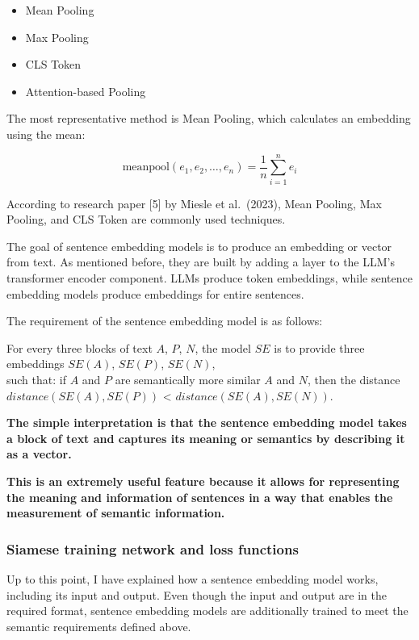 \documentclass[11pt]{wseas}
\begin{document}
\begin{itemize}
\tightlist
\item
  Mean Pooling
\item
  Max Pooling
\item
  CLS Token
\item
  Attention-based Pooling
\end{itemize}

The most representative method is Mean Pooling, which calculates an
embedding using the mean:

\[
\text{meanpool}(e_1, e_2, \ldots, e_n) = \frac{1}{n} \sum_{i=1}^{n} e_i
\]

According to research paper {[}5{]} by Miesle et al.~(2023), Mean
Pooling, Max Pooling, and CLS Token are commonly used techniques.

The goal of sentence embedding models is to produce an embedding or
vector from text. As mentioned before, they are built by adding a layer
to the LLM's transformer encoder component. LLMs produce token
embeddings, while sentence embedding models produce embeddings for
entire sentences.

The requirement of the sentence embedding model is as follows:

For every three blocks of text \(A\), \(P\), \(N\), the model \(SE\) is
to provide three embeddings \(SE(A)\), \(SE(P)\), \(SE(N)\),\\
such that: if \(A\) and \(P\) are semantically more similar \(A\) and
\(N\), then the distance \(distance(SE(A), SE(P))\) \textless{}
\(distance(SE(A), SE(N))\).

\textbf{The simple interpretation is that the sentence embedding model
takes a block of text and captures its meaning or semantics by
describing it as a vector.}

\textbf{This is an extremely useful feature because it allows for
representing the meaning and information of sentences in a way that
enables the measurement of semantic information.}

    \newpage

\subsubsection{Siamese training network and loss
functions}\label{siamese-training-network-and-loss-functions}

Up to this point, I have explained how a sentence embedding model works,
including its input and output. Even though the input and output are in
the required format, sentence embedding models are additionally trained
to meet the semantic requirements defined above.
\end{document}
